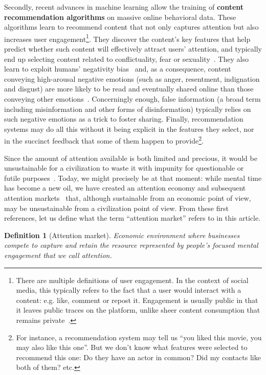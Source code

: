 \documentclass[10pt]{article}
\newtheorem{definition}{Definition}[section]
\begin{document}
Secondly, recent advances in machine learning allow the training of \textbf{content recommendation algorithms} on massive online behavioral data. These algorithms learn to recommend content that not only captures attention but also increases user engagement\footnote{There are multiple definitions of user engagement. In the context of social media, this typically refers to the fact that a user would interact with a content: e.g. like, comment or repost it. Engagement is usually public in that it leaves public traces on the platform, unlike sheer content consumption that remains private~\cite{robertson_negativity_2023}.}.
They discover the content's key features that help predict whether such content will effectively attract users' attention, and typically end up selecting content related to conflictuality, fear or sexuality~\cite{bronner2021}.
They also learn to exploit humans' negativity bias~\cite{soroka_cross-national_2019,siegrist_better_2001} and, as a consequence, content conveying high-arousal negative emotions (such as anger, resentment, indignation and disgust) are more likely to be read and eventually shared online than those conveying other emotions~\cite{robertson_negativity_2023,kohout_may_2023}. 
Concerningly enough, false information (a broad term including misinformation and other forms of disinformation) typically relies on such negative emotions as a trick to foster sharing.
Finally, recommendation systems may do all this without it being explicit in the features they select, nor in the succinct feedback that some of them happen to provide\footnote{For instance, a recommendation system may tell us ``you liked this movie, you may also like this one''. But we don't know what features were selected to recommend this one: Do they have an actor in common? Did my contacts like both of them? etc.}.

Since the amount of attention available is both limited and precious, it would be unsustainable for a civilization to waste it with impunity for questionable or futile purposes~\cite{bronner2021}.
Today, we might precisely be at that moment: while mental time has become a new oil, we have created an attention economy and subsequent attention markets~\cite{hefti_economics_2015,hendricks_attention_2019} that, although sustainable from an economic point of view, may be unsustainable from a civilization point of view.
From these first references, let us define what the term ``attention market'' refers to in this article.

\begin{definition}[Attention market]
  Economic environment where businesses compete to capture and retain the resource represented by people's focused mental engagement that we call attention.
\end{definition}
\end{document}
